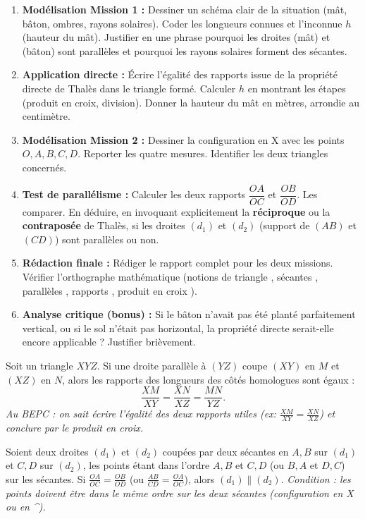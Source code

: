 \documentclass[11pt]{article}
\newcounter{popsec}
\newcounter{popsub}
\newcommand{\courssub}[1]{%
  \stepcounter{popsub}%
  \par\vspace{9pt}\noindent{\popxbold\fontsize{11.5}{13}\selectfont\color{popink}{\color{poporange}\thepopsec.\thepopsub}\hspace{6pt}#1}\par\nopagebreak\vspace{4pt}
}
\begin{document}
\begin{enumerate}
    \item \textbf{Modélisation Mission 1 :} Dessiner un schéma clair de la situation (mât, bâton, ombres, rayons solaires). Coder les longueurs connues et l'inconnue $h$ (hauteur du mât). Justifier en une phrase pourquoi les droites (mât) et (bâton) sont parallèles et pourquoi les rayons solaires forment des sécantes.
    \item \textbf{Application directe :} Écrire l'égalité des rapports issue de la propriété directe de Thalès dans le triangle formé. Calculer $h$ en montrant les étapes (produit en croix, division). Donner la hauteur du mât en mètres, arrondie au centimètre.
    \item \textbf{Modélisation Mission 2 :} Dessiner la configuration en \og X \fg{} avec les points $O, A, B, C, D$. Reporter les quatre mesures. Identifier les deux triangles concernés.
    \item \textbf{Test de parallélisme :} Calculer les deux rapports $\dfrac{OA}{OC}$ et $\dfrac{OB}{OD}$. Les comparer. En déduire, en invoquant explicitement la \textbf{réciproque} ou la \textbf{contraposée} de Thalès, si les droites $(d_1)$ et $(d_2)$ (support de $(AB)$ et $(CD)$) sont parallèles ou non.
    \item \textbf{Rédaction finale :} Rédiger le rapport complet pour les deux missions. Vérifier l'orthographe mathématique (notions de \og triangle \fg{}, \og sécantes \fg{}, \og parallèles \fg{}, \og rapports \fg{}, \og produit en croix \fg{}).
    \item \textbf{Analyse critique (bonus) :} Si le bâton n'avait pas été planté parfaitement vertical, ou si le sol n'était pas horizontal, la propriété directe serait-elle encore applicable ? Justifier brièvement.
\end{enumerate}

\courssub{Ressources à mobiliser}
\begin{propriete}
Soit un triangle $XYZ$. Si une droite parallèle à $(YZ)$ coupe $(XY)$ en $M$ et $(XZ)$ en $N$, alors les rapports des longueurs des côtés homologues sont égaux :
\[
\frac{XM}{XY} = \frac{XN}{XZ} = \frac{MN}{YZ}.
\]
\emph{Au BEPC : on sait écrire l'égalité des deux rapports utiles (ex: $\frac{XM}{XY}=\frac{XN}{XZ}$) et conclure par le produit en croix.}
\end{propriete}

\begin{propriete}
Soient deux droites $(d_1)$ et $(d_2)$ coupées par deux sécantes en $A,B$ sur $(d_1)$ et $C,D$ sur $(d_2)$, les points étant dans l'ordre $A,B$ et $C,D$ (ou $B,A$ et $D,C$) sur les sécantes. Si $\frac{OA}{OC} = \frac{OB}{OD}$ (ou $\frac{AB}{CD} = \frac{OA}{OC}$), alors $(d_1) \parallel (d_2)$.
\emph{Condition : les points doivent être dans le même ordre sur les deux sécantes (configuration en X ou en \textasciicircum).}
\end{propriete}
\end{document}
